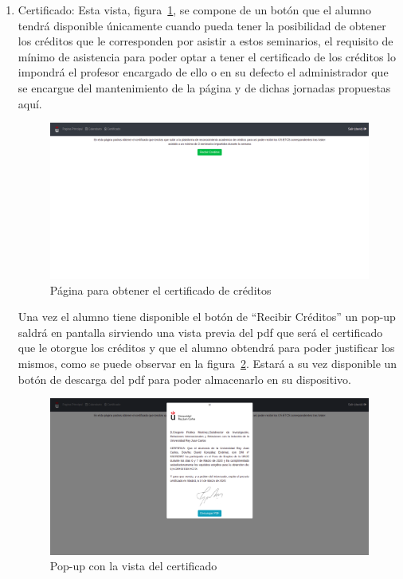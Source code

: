 \documentclass[a4paper, 12pt]{book}
\begin{document}
\begin{enumerate}
  \item Certificado: Esta vista, figura~\ref{fig:recibirCred}, se compone de un botón que el alumno tendrá disponible únicamente cuando pueda tener la posibilidad de obtener los créditos que le corresponden por asistir a estos seminarios, el requisito de mínimo de asistencia para poder optar a tener el certificado de los créditos lo impondrá el profesor encargado de ello o en su defecto el administrador que se encargue del mantenimiento de la página y de dichas jornadas propuestas aquí. 
  
    \begin{figure}
  	\centering
  	\includegraphics[width=16cm, keepaspectratio]{img/recibirCred.png}
  	\caption{Página para obtener el certificado de créditos}\label{fig:recibirCred}
	\end{figure}
  
  
  Una vez el alumno tiene disponible el botón de ``Recibir Créditos'' un pop-up saldrá en pantalla sirviendo una vista previa del pdf que será el certificado que le otorgue los créditos y que el alumno obtendrá para poder justificar los mismos, como se puede observar en la figura~\ref{fig:pdfVisual}. Estará a su vez disponible un botón de descarga del pdf para poder almacenarlo en su dispositivo.
  
      \begin{figure}
  	\centering
  	\includegraphics[width=16cm, keepaspectratio]{img/pdfVisual.png}
  	\caption{Pop-up con la vista del certificado}\label{fig:pdfVisual}
	\end{figure}
  
\end{enumerate}
\end{document}
